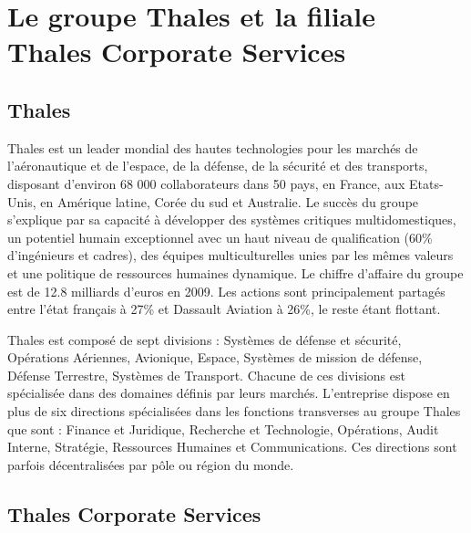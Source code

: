 \section{Le groupe Thales et la filiale Thales Corporate Services}

\subsection{Thales}

Thales est un leader mondial des hautes technologies pour les marchés de 
l’aéronautique et de l’espace, de la défense, de la sécurité et des transports, 
disposant d’environ 68 000 collaborateurs dans 50 pays, en France, aux 
Etats-Unis, en Amérique latine, Corée du sud et Australie. Le succès du groupe 
s'explique par sa capacité à développer des systèmes critiques multidomestiques,
un potentiel humain exceptionnel avec un haut niveau de qualification (60\% 
d’ingénieurs et cadres), des équipes multiculturelles unies par les mêmes 
valeurs et une politique de ressources humaines dynamique. Le chiffre d'affaire
du groupe est de 12.8 milliards d'euros en 2009. Les actions sont principalement
partagés entre l'état français à 27\% et Dassault Aviation à 26\%, le reste étant 
flottant.

Thales est composé de sept divisions : Systèmes de défense et sécurité, 
Opérations Aériennes, Avionique, Espace, Systèmes de mission de défense, 
Défense Terrestre, Systèmes de Transport.
Chacune de ces divisions est spécialisée dans des domaines définis par leurs 
marchés. L’entreprise dispose en plus de six directions spécialisées dans les 
fonctions transverses au groupe Thales que sont : Finance et Juridique, 
Recherche et Technologie, Opérations, Audit Interne, Stratégie, Ressources 
Humaines et Communications. Ces directions sont parfois décentralisées par pôle 
ou région du monde.

\subsection{Thales Corporate Services}


